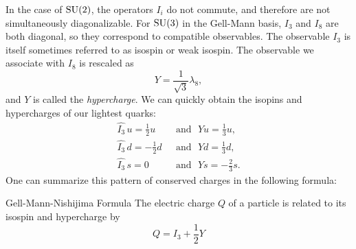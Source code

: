 In the case of $\operatorname{SU}(2)$, the operators $I_i$ do not commute, and therefore are
not simultaneously diagonalizable. For $\operatorname{SU}(3)$ in the Gell-Mann basis,
$I_3$ and $I_8$ are both diagonal, so they correspond to compatible
observables. The observable $I_3$ is itself sometimes referred to
as isospin or weak isospin. The observable we associate with $I_8$ is rescaled as
\begin{equation}
  Y=\frac{1}{\sqrt{3}}\lambda_8,
\end{equation}
and $Y$ is called the {\it hypercharge}. 
We can quickly obtain the isopins and hypercharges of
our lightest quarks: 
\begin{equation}\begin{aligned}
\hat{I_3}\,u =\frac{1}{2}u ~~~ &\text{and}~~~\hat{Y}u=\frac{1}{3}u,\\
\hat{I_3}\,d =-\frac{1}{2}d ~~~ &\text{and}~~~\hat{Y}d=\frac{1}{3}d,\\
\hat{I_3}\,s = 0           ~~~ &\text{and}~~~\hat{Y}s=-\frac{2}{3}s.
\end{aligned}\end{equation}
One can summarize this pattern of conserved charges in the following formula:
\begin{theorem}{Gell-Mann-Nishijima Formula}{}
  The electric charge $Q$ of a particle is related to its isospin and
  hypercharge by
  \begin{equation*}
    Q=I_3+\frac{1}{2}Y
  \end{equation*}
\end{theorem}


